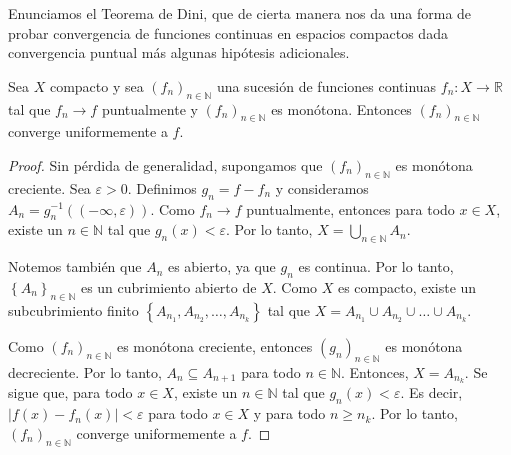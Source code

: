 Enunciamos el Teorema de Dini, que de cierta manera nos da una forma de probar convergencia de funciones continuas en espacios compactos dada convergencia puntual más algunas hipótesis adicionales.

\begin{theorem}[Dini]
	Sea $X$ compacto y sea $(f_n)_{n \in \mathbb{N}}$ una sucesión de funciones continuas $f_n : X \to \mathbb{R}$ tal que $f_n \to f$ puntualmente y $(f_n)_{n \in \mathbb{N}}$ es monótona. Entonces $(f_n)_{n \in \mathbb{N}}$ converge uniformemente a $f$.
\end{theorem}

\begin{proof}
	Sin pérdida de generalidad, supongamos que $(f_n)_{n \in \mathbb{N}}$ es monótona creciente. Sea $\varepsilon > 0$. Definimos $g_n = f - f_n$ y consideramos $A_n = g_n^{-1}((-\infty, \varepsilon))$. Como $f_n \to f$ puntualmente, entonces para todo $x \in X$, existe un $n \in \mathbb{N}$ tal que $g_n(x) < \varepsilon$. Por lo tanto, $X = \bigcup_{n \in \mathbb{N}} A_n$.
	
	Notemos también que $A_n$ es abierto, ya que $g_n$ es continua. Por lo tanto, $\left\{ A_n \right\}_{n \in \mathbb{N}}$ es un cubrimiento abierto de $X$. Como $X$ es compacto, existe un subcubrimiento finito $\left\{ A_{n_1}, A_{n_2}, \ldots, A_{n_k} \right\}$ tal que $X = A_{n_1} \cup A_{n_2} \cup \ldots \cup A_{n_k}$.

	Como $(f_n)_{n \in \mathbb{N}}$ es monótona creciente, entonces $(g_n)_{n \in \mathbb{N}}$ es monótona decreciente. Por lo tanto, $A_n \subseteq A_{n+1}$ para todo $n \in \mathbb{N}$. Entonces, $X = A_{n_k}$. Se sigue que, para todo $x \in X$, existe un $n \in \mathbb{N}$ tal que $g_n(x) < \varepsilon$. Es decir, $|f(x) - f_n(x)| < \varepsilon$ para todo $x \in X$ y para todo $n \geq n_k$. Por lo tanto, $(f_n)_{n \in \mathbb{N}}$ converge uniformemente a $f$.
\end{proof}
